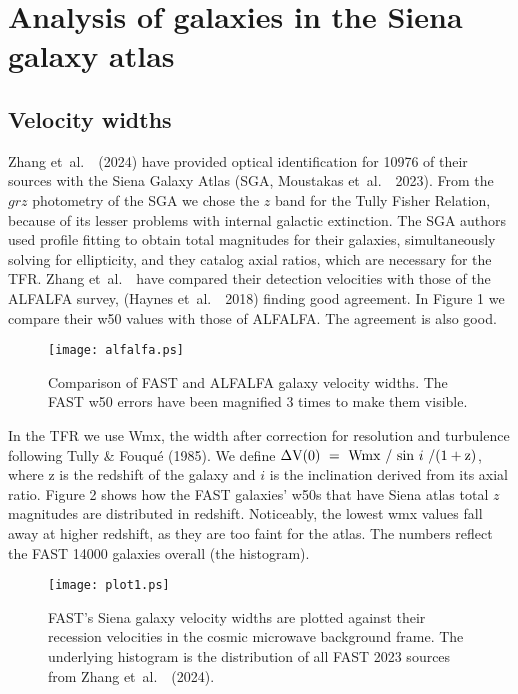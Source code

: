 \documentclass{article}
\newcommand{\etal}{\mbox{\rm{et al.}~~}}
\begin{document}
\section{Analysis of galaxies in the Siena galaxy atlas}
\subsection{Velocity widths}
Zhang \etal (2024) have provided optical identification for 10976 of their sources with the Siena Galaxy Atlas (SGA, Moustakas \etal 2023). From the $grz$ photometry of the SGA we chose the $z$ band for the Tully Fisher Relation, because of its lesser problems with internal galactic extinction. The SGA authors used profile fitting to obtain total magnitudes for their galaxies, simultaneously solving for ellipticity, and they catalog axial ratios, which are necessary for the TFR. 
Zhang \etal have compared their detection velocities with those of the ALFALFA survey, 
(Haynes \etal 2018) finding good agreement. In Figure 1 we compare their w50 values with those of ALFALFA. The agreement is also good.

\begin{figure}	
\texttt{[image: alfalfa.ps]}
\caption{Comparison of FAST and ALFALFA galaxy velocity widths.
	The FAST w50 errors have been magnified 3 times to make them visible.}
\end{figure}

In the TFR we use Wmx, the width after correction for resolution and turbulence following Tully \& Fouqu\'e (1985).
We define $\Delta{\rm V(0)~ =~ Wmx~ /~ sin}~ i~/\rm{(1+z)}$, where z is the redshift of the galaxy and $i$ is the inclination derived from its axial ratio.
Figure 2 shows how the FAST galaxies' w50s that have Siena atlas total $z$ magnitudes are distributed in redshift. 
Noticeably, the lowest wmx values fall away at higher redshift, as they are too faint for the atlas. The numbers reflect the FAST 14000 galaxies overall (the histogram). 

\begin{figure}	
\texttt{[image: plot1.ps]}
\caption{FAST's Siena galaxy velocity widths are plotted against their recession velocities in the cosmic microwave background frame. The underlying histogram is the distribution of all FAST 2023 sources from Zhang \etal (2024).}
\end{figure}
\end{document}
